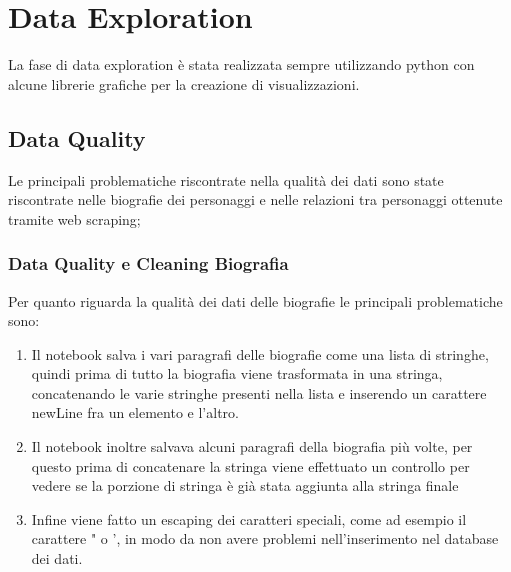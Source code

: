 \documentclass[
10pt, %
a4paper, %
oneside, %
headinclude,footinclude, %
BCOR5mm, %
]{scrartcl}
\begin{document}
\section{Data Exploration}
La fase di data exploration è stata realizzata sempre utilizzando python con alcune librerie grafiche per la creazione di visualizzazioni.

\subsection{Data Quality}
Le principali problematiche riscontrate nella qualità dei dati sono state riscontrate nelle biografie dei personaggi e nelle relazioni tra personaggi ottenute tramite web scraping;
\subsubsection{Data Quality e Cleaning Biografia}
Per quanto riguarda la qualità dei dati delle biografie le principali problematiche sono:
\begin{enumerate}
	\item Il notebook salva i vari paragrafi delle biografie come una lista di stringhe, quindi prima di tutto la biografia viene trasformata in una stringa, concatenando le varie stringhe presenti nella lista e inserendo un carattere newLine fra un elemento e l'altro.
	\item Il notebook inoltre salvava alcuni paragrafi della biografia più volte, per questo prima di concatenare la stringa viene effettuato un controllo per vedere se la porzione di stringa è già stata aggiunta alla stringa finale
	\item Infine viene fatto un escaping dei caratteri speciali, come ad esempio il carattere " o ', in modo da non avere problemi nell'inserimento nel database dei dati.
\end{enumerate}
\end{document}
